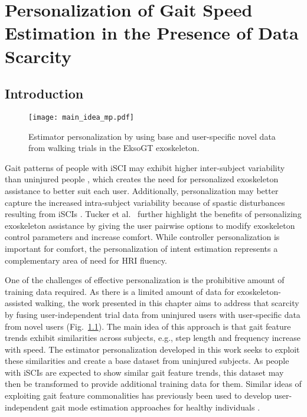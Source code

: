 \chapter{Personalization of Gait Speed Estimation in the Presence of Data Scarcity}\label{chapter:MP}

\section{Introduction}

\begin{figure}
	\centering
	\texttt{[image: main\_idea\_mp.pdf]}
	\caption{Estimator personalization by using base and user-specific novel data from walking trials in the EksoGT exoskeleton.}\label{fig:main_idea_mp}
\end{figure}

Gait patterns of people with iSCI may exhibit higher inter-subject variability than uninjured people \cite{sohn2018variability}, which creates the need for personalized exoskeleton assistance to better suit each user. Additionally, personalization may better capture the increased intra-subject variability because of spastic disturbances resulting from iSCIs \cite{krawetz1996gait}. Tucker et al.~\cite{tucker2020preference} further highlight the benefits of personalizing exoskeleton assistance by giving the user pairwise options to modify exoskeleton control parameters and increase comfort. While controller personalization is important for comfort, the personalization of intent estimation represents a complementary area of need for HRI fluency.

One of the challenges of effective personalization is the prohibitive amount of training data required. As there is a limited amount of data for exoskeleton-assisted walking, the work presented in this chapter aims to address that scarcity by fusing user-independent trial data from uninjured users with user-specific data from novel users (Fig.~\ref{fig:main_idea_mp}).
The main idea of this approach is that gait feature trends exhibit similarities across subjects, e.g., step length and frequency increase with speed. The estimator personalization developed in this work seeks to exploit these similarities and create a base dataset from uninjured subjects. As people with iSCIs are expected to show similar gait feature trends, this dataset may then be transformed to provide additional training data for them. Similar ideas of exploiting gait feature commonalities has previously been used to develop user-independent gait mode estimation approaches for healthy individuals \cite{kilmartin2009optimising,ibrahim2008gait}. 

